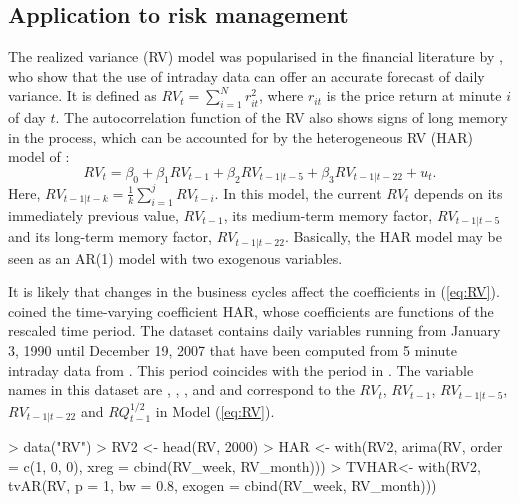 \subsection{Application to risk management}
\label{sec:RV}
The realized variance (RV) model was popularised in the financial literature by \citet{Andersenetal1998}, who show that the use of intraday data can offer an accurate forecast of daily variance. It is defined as $RV_t = \sum_{i = 1}^N r_{it}^2$, where $r_{it}$ is the price return at minute $i$ of day $t$. The autocorrelation function of the RV also shows signs of long memory in the process, which can be accounted for by the heterogeneous RV (HAR) model of \citet{Corsi2009}:
\begin{equation}
RV_t = \beta_0 + \beta_1 RV_{t-1} + \beta_2 RV_{t-1|t-5} + \beta_3 RV_{t-1|t-22} + u_{t}.
\label{eq:RV}
\end{equation}
Here, $RV_{t-1|t-k} = \frac{1}{k}\sum_{i = 1}^j RV_{t-i}$. In this model, the current $RV_t$ depends on its immediately previous value, $RV_{t-1}$, its medium-term memory factor, $RV_{t-1|t-5}$ and its long-term memory factor, $RV_{t-1|t-22}$. Basically, the HAR model may be seen as an AR(1) model with two exogenous variables. 

It is likely that changes in the business cycles affect the coefficients in (\ref{eq:RV}). \citet{Chenetal2017} coined the time-varying coefficient HAR, whose coefficients are functions of  the rescaled time period. The  dataset contains daily variables running from January 3, 1990 until December 19, 2007 that have been computed from 5 minute intraday data from \citet{RVdata}. This period coincides with the period in \citet{Bollerslevetal2009}. The variable names in this dataset are , , ,  and  and correspond to the $RV_t$, $RV_{t-1}$, $RV_{t-1|t-5}$, $RV_{t-1|t-22}$ and $RQ_{t-1}^{1/2}$ in Model (\ref{eq:RV}). 


\begin{Schunk}
\begin{Sinput}
> data("RV")
> RV2 <- head(RV, 2000)
> HAR <- with(RV2, arima(RV, order = c(1, 0, 0), xreg = cbind(RV_week, RV_month)))
> TVHAR<- with(RV2, tvAR(RV, p = 1, bw = 0.8, exogen = cbind(RV_week, RV_month)))
\end{Sinput}
\end{Schunk}

